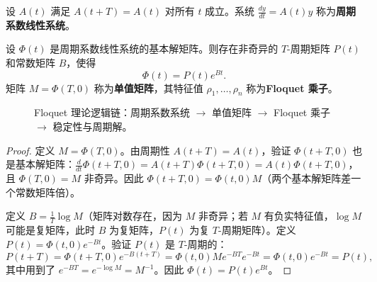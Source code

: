 \begin{definition}[周期系数线性系统]\label{def:periodic_coefficient_system}
设 $A(t)$ 满足 $A(t+T) = A(t)$ 对所有 $t$ 成立。系统 $\frac{dy}{dt} = A(t) y$ 称为\textbf{周期系数线性系统}。
\end{definition}

\begin{theorem}[Floquet 定理]\label{thm:floquet}
设 $\Phi(t)$ 是周期系数线性系统的基本解矩阵。则存在非奇异的 $T$-周期矩阵 $P(t)$ 和常数矩阵 $B$，使得
\[
\Phi(t) = P(t) e^{Bt}.
\]
矩阵 $M = \Phi(T, 0)$ 称为\textbf{单值矩阵}，其特征值 $\rho_1, \dots, \rho_n$ 称为\textbf{Floquet 乘子}。
\end{theorem}

\begin{figure}[htbp]
\centering
{}
\caption{Floquet 理论逻辑链：周期系数系统 $\to$ 单值矩阵 $\to$ Floquet 乘子 $\to$ 稳定性与周期解。}
\label{fig:floquet_flow}
\end{figure}

\begin{proof}
定义 $M = \Phi(T, 0)$。由周期性 $A(t+T) = A(t)$，验证 $\Phi(t+T, 0)$ 也是基本解矩阵：$\frac{d}{dt}\Phi(t+T, 0) = A(t+T)\Phi(t+T, 0) = A(t)\Phi(t+T, 0)$，且 $\Phi(T, 0) = M$ 非奇异。因此 $\Phi(t+T, 0) = \Phi(t, 0) M$（两个基本解矩阵差一个常数矩阵倍）。

定义 $B = \frac{1}{T} \log M$（矩阵对数存在，因为 $M$ 非奇异；若 $M$ 有负实特征值，$\log M$ 可能是复矩阵，此时 $B$ 为复矩阵，$P(t)$ 为复 $T$-周期矩阵）。定义 $P(t) = \Phi(t, 0) e^{-Bt}$。验证 $P(t)$ 是 $T$-周期的：
\[
P(t+T) = \Phi(t+T, 0) e^{-B(t+T)} = \Phi(t, 0) M e^{-BT} e^{-Bt} = \Phi(t, 0) e^{-Bt} = P(t),
\]
其中用到了 $e^{-BT} = e^{-\log M} = M^{-1}$。因此 $\Phi(t) = P(t) e^{Bt}$。
\end{proof}

